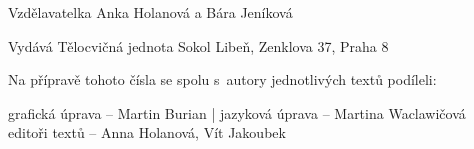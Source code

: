 \documentclass[11pt]{article}
\begin{document}
\hfill Vzdělavatelka Anka Holanová a Bára Jeníková

\clearpage

\pagestyle{blank}

\vspace*{96pt}

\pagecolor{sokolred}
\color{white}


\vspace*{\fill}

\begin{center}
Vydává Tělocvičná jednota Sokol Libeň, Zenklova 37, Praha 8

\vspace*{12pt}

Na přípravě tohoto čísla se spolu s~autory jednotlivých textů podíleli:

grafická úprava – Martin Burian | jazyková úprava – Martina Waclawičová \\ editoři textů – Anna Holanová, Vít Jakoubek
\end{center}
\end{document}

